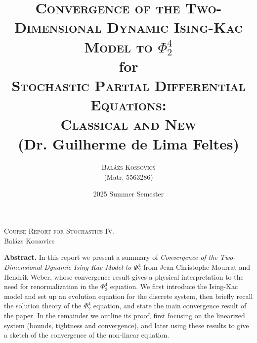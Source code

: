 \documentclass{report}
\title{\textsc{Convergence of the Two-Dimensional Dynamic Ising-Kac Model to $\Phi^4_2$}
\\[1.5em]
{\small {for}}\\[1.5em]
{\Large \textsc{Stochastic Partial Differential Equations: \\Classical and New}}\\
{\large (Dr. Guilherme de Lima Feltes)}}
\author{
    \textsc{Balázs Kossovics}\\
    {\small (Matr. 5563286)}
}
\date{2025 Summer Semester}
\theoremstyle{remark}
\theoremstyle{definition}
\begin{document}
\begin{center}
    \Large{{\textsc{Course Report for Stochastics IV.}}}\\[1em]
    \normalsize
    Balázs Kossovics \\[0.25em]
\end{center}

\vspace{1em}
\noindent\textbf{Abstract.} In this report we present a summary of \textit{Convergence of the Two-Dimensional Dynamic Ising-Kac Model to $\Phi^4_2$} from Jean-Christophe Mourrat and Hendrik Weber, whose convergence result gives a physical interpretation to the need for renormalization in the $\Phi^4_2$ equation. We first introduce the Ising-Kac model and set up an evolution equation for the discrete system, then briefly recall the solution theory of the $\Phi^4_2$ equation, and state the main convergence result of the paper. In the remainder we outline its proof, first focusing on the linearized system (bounds, tightness and convergence), and later using these results to give a sketch of the convergence of the non-linear equation.

\tableofcontents
\end{document}

